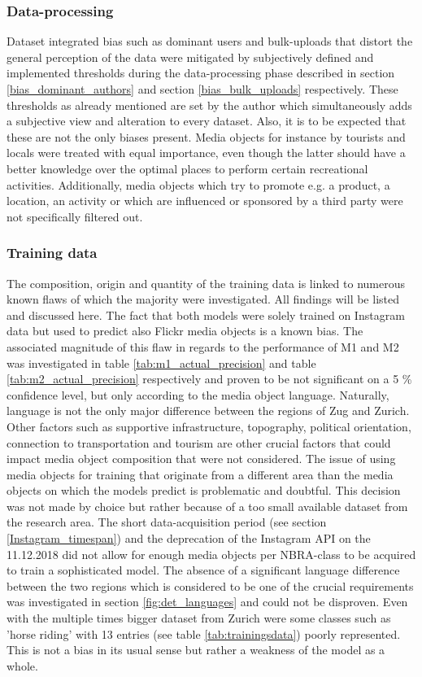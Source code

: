\subsubsection{Data-processing} Dataset integrated bias such as dominant users and bulk-uploads that distort the general perception of the data were mitigated by subjectively defined and implemented thresholds during the data-processing phase described in section \ref{bias_dominant_authors} and section \ref{bias_bulk_uploads} respectively. These thresholds as already mentioned are set by the author which simultaneously adds a subjective view and alteration to every dataset. Also, it is to be expected that these are not the only biases present. Media objects for instance by tourists and locals were treated with equal importance, even though the latter should have a better knowledge over the optimal places to perform certain recreational activities. Additionally, media objects which try to promote e.g. a product, a location, an activity or which are influenced or sponsored by a third party were not specifically filtered out.\\

\subsubsection{Training data} The composition, origin and quantity of the training data is linked to numerous known flaws of which the majority were investigated. All findings will be listed and discussed here. The fact that both models were solely trained on Instagram data but used to predict also Flickr media objects is a known bias. The associated magnitude of this flaw in regards to the performance of M1 and M2 was investigated in table \ref{tab:m1_actual_precision} and table \ref{tab:m2_actual_precision} respectively and proven to be not significant on a 5 \% confidence level, but only according to the media object language. Naturally, language is not the only major difference between the regions of Zug and Zurich. Other factors such as supportive infrastructure, topography, political orientation, connection to transportation and tourism are other crucial factors that could impact media object composition that were not considered. The issue of using media objects for training that originate from a different area than the media objects on which the models predict is problematic and doubtful. This decision was not made by choice but rather because of a too small available dataset from the research area. The short data-acquisition period (see section \ref{Instagram_timespan}) and the deprecation of the Instagram API on the 11.12.2018 did not allow for enough media objects per NBRA-class to be acquired to train a sophisticated model. The absence of a significant language difference between the two regions which is considered to be one of the crucial requirements was investigated in section \ref{fig:det_languages} and could not be disproven. Even with the multiple times bigger dataset from Zurich were some classes such as 'horse riding' with 13 entries (see table \ref{tab:trainingsdata}) poorly represented. This is not a bias in its usual sense but rather a weakness of the model as a whole. \\

